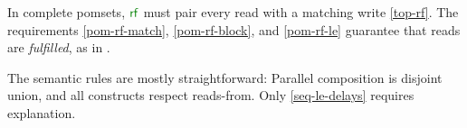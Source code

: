 In complete pomsets, $\rrfx$ must pair every read with a matching write
\eqref{top-rf}.  The requirements \ref{pom-rf-match}, \ref{pom-rf-block}, and
\ref{pom-rf-le} guarantee that reads are \emph{fulfilled}, as in
\cite[]{DBLP:journals/pacmpl/JagadeesanJR20}.

The semantic rules are mostly straightforward: Parallel composition is disjoint
union, and all constructs respect reads-from.  Only \ref{seq-le-delays}
requires explanation.





